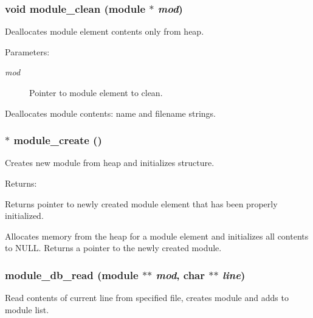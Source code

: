 \subsubsection{\setlength{\rightskip}{0pt plus 5cm}void module\_\-clean ({\bf module} $\ast$ {\em mod})}\label{module_8h_a7}


Deallocates module element contents only from heap.

\begin{Desc}
\item[Parameters: ]\par
\begin{description}
\item[{\em 
mod}]Pointer to module element to clean.\end{description}
\end{Desc}
Deallocates module contents: name and filename strings. 
\subsubsection{$\ast$ module\_\-create ()}\label{module_8h_a1}


Creates new module from heap and initializes structure.

\begin{Desc}
\item[Returns: ]\par
Returns pointer to newly created module element that has been properly initialized.\end{Desc}
Allocates memory from the heap for a module element and initializes all contents to NULL. Returns a pointer to the newly created module. 
\subsubsection{ module\_\-db\_\-read ({\bf module} $\ast$$\ast$ {\em mod}, char $\ast$$\ast$ {\em line})}\label{module_8h_a4}


Read contents of current line from specified file, creates module and adds to module list.

